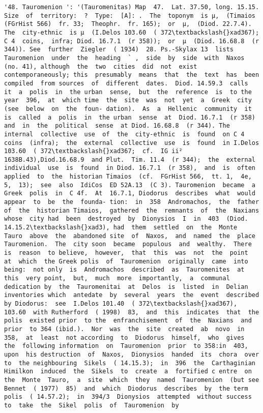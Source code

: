 \documentclass[11pt]{article}
\begin{document}
\begin{Verbatim}[commandchars=\\\{\}]
         '48. Tauromenion ': '(Tauromenitas) Map  47.  Lat. 37.50, long. 15.15.  Size  of  territory:  ?  Type:  [A]: .  The  toponym  is µ,  (Timaios  (FGrHist 566)  fr. 33;  Theophr.  fr. 165);  or  µ,  (Diod. 22.7.4).  The  city-ethnic  is µ  (I.Delos 103.60  ( 372\textbackslash{}xad367);  C 4  coins,  infra; Diod. 16.7.1  (r 358));  or  µ  (Diod. 16.68.8  (r 344)). See  further  Ziegler  ( 1934)  28. Ps.-Skylax 13  lists  Tauromenion  under  the  heading  ` ,  side  by  side  with  Naxos  (no. 41), although  the  two  cities  did  not  exist  contemporaneously; this  presumably  means  that  the  text  has  been  compiled  from sources  of  different  dates.  Diod. 14.59.3  calls  it  a  polis  in  the urban  sense,  but  the  reference  is  to the  year  396,  at  which time  the  site  was  not  yet  a  Greek  city  (see  below  on  the  foun- dation).  As  a  Hellenic  community  it  is  called  a  polis  in  the urban  sense  at  Diod. 16.7.1  (r 358)  and  in  the  political  sense  at Diod. 16.68.8  (r 344). The  internal  collective  use  of  the  city-ethnic  is  found  on C 4  coins  (infra);  the  external  collective  use  is  found  in I.Delos 103.60  ( 372\textbackslash{}xad367;  cf.  IG ii²  1638B.43),Diod.16.68.9  and Plut.  Tim. 11.4  (r 344);  the  external  individual  use  is  found  in Diod. 16.7.1  (r 358),  and  is  often  applied  to  the  historian Timaios  (cf.  FGrHist 566,  tt. 1,  4e,  5,  13);  see  also  IdiCos  ED 52A.13  (C 3). Tauromenion  became  a  Greek  polis  in  C 4f.  At  16.7.1, Diodorus  describes  what  would  appear  to  be  the  founda- tion:  in  358  Andromachos,  the  father  of  the  historian Timaios,  gathered  the  remnants  of  the  Naxians  whose  city had  been  destroyed  by  Dionysios  I  in  403  (Diod. 14.15.2\textbackslash{}xad3), had  them  settled  on  the  Monte  Tauro  above  the  abandoned site  of  Naxos,  and  named  the  place  Tauromenion.  The  city soon  became  populous  and  wealthy.  There  is  reason  to believe,  however,  that  this  was  not  the  point  at  which  the Greek polis  of  Tauromenion  originally  came  into  being:  not only  is  Andromachos  described  as  Tauromenites  at  this  very point,  but,  much  more  importantly,  a  communal  dedication by  the  Tauromenitai  at  Delos  is  listed  in  Delian  inventories which  antedate  by  several  years  the  event  described  by Diodorus:  see  I.Delos 101.40  ( 372\textbackslash{}xad367),  103.60  with Rutherford  ( 1998)  83,  and  this  indicates  that  the  polis  existed prior  to the  enfranchisement  of  the  Naxians  and  prior  to 364 (ibid.).  Nor  was  the  site  created  ab  novo  in 358,  at  least  not according  to  Diodorus  himself,  who  gives  the  following information  on  Tauromenion  prior  to 358:in  403,  upon  his destruction  of  Naxos,  Dionysios  handed  its  chora  over  to  the neighbouring  Sikels  ( 14.15.3);  in  396  the  Carthaginian Himilkon  induced  the  Sikels  to  create  a  fortified c entre  on the  Monte  Tauro,  a  site  which  they  named  Tauromenion  (but see  Bennet  ( 1977)  85)  and  which  Diodorus  describes  by  the term polis  ( 14.57.2);  in  394/3  Dionysios  attempted  without success  to  take  the  Sikel  polis  of  Tauromenion  by 
\end{Verbatim}
\end{document}
